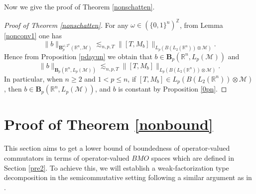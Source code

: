 \documentclass[oneside,english,a4wide]{amsart}
\numberwithin{equation}{section}
\numberwithin{figure}{section}
\theoremstyle{plain}
\theoremstyle{plain}
\theoremstyle{definition}
\theoremstyle{plain}
\theoremstyle{remark}
\theoremstyle{definition}
\theoremstyle{remark}
\theoremstyle{definition}
\newcommand{\8}{\infty}
\begin{document}
Now we give the proof of Theorem \ref{nonschatten}.
\begin{proof}[Proof of Theorem \ref{nonschatten}]
	For any $\omega\in(\{0,1\}^n)^\mathbb{Z}$, from Lemma \ref{nonconv1} one has
	\begin{equation*}
		\|b\|_{\pmb{B}_p^{\omega,2^n}(\mathbb{R}^n,\mathcal{M})}\lesssim_{n,p,T}\|[T,M_b]\|_{L_p(B(L_2(\mathbb{R}^n))\otimes \mathcal{M})}.
	\end{equation*}
	Hence from Proposition \ref{pdayun} we obtain that $b\in \pmb{B}_p(\mathbb{R}^n, L_p(\mathcal{M}))$ and
	\begin{equation*}
		\|b\|_{\pmb{B}_p(\mathbb{R}^n, L_p(\mathcal{M}))}\lesssim_{n,p,T} \|[T,M_{b}]\|_{L_p(B(L_2(\mathbb{R}^n))\otimes \mathcal{M})}.
	\end{equation*}
	In particular, when $n\geq 2$ and $1<p\leq n$, if $[T,M_b]\in L_p(B(L_2(\mathbb{R}^n))\otimes \mathcal{M})$, then $b\in \pmb{B}_p(\mathbb{R}^n, L_p(\mathcal{M}))$, and $b$ is constant by Proposition \ref{0pn}.
\end{proof}	


\bigskip




\section{Proof of Theorem \ref{nonbound}}\label{noncomboundconv}


This section aims to get a lower bound of boundedness of operator-valued commutators in terms of operator-valued $BMO$ spaces which are defined in Section \ref{pre2}. To achieve this, we will establish a weak-factorization type decomposition in the semicommutative setting following a similar argument as in \cite[Lemma 2.3.1]{TH3}.
\end{document}
